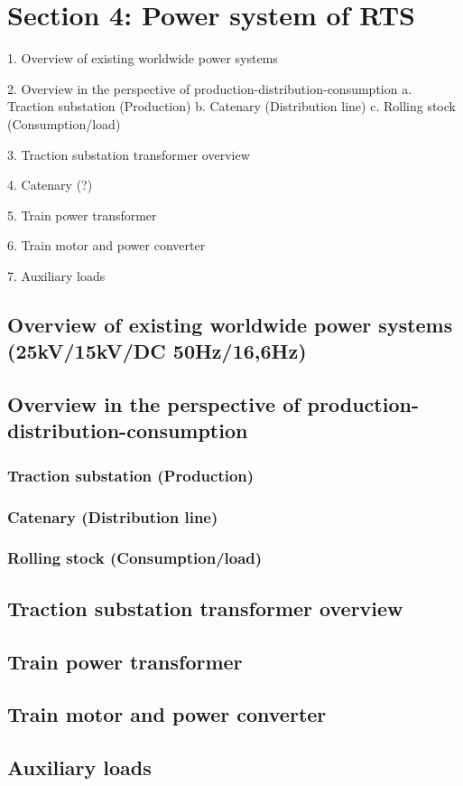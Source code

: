 




\section{Section 4: Power system of RTS}

1.	Overview of existing worldwide power systems

2.	Overview in the perspective of production-distribution-consumption
a.	Traction substation (Production)
b.	Catenary (Distribution line)
c.	Rolling stock (Consumption/load)

3.	Traction substation transformer overview

4.	Catenary (?)

5.	Train power transformer

6.	Train motor and power converter

7.	Auxiliary loads

\subsection{Overview of existing worldwide power systems (25kV/15kV/DC 50Hz/16,6Hz)}

\subsection{Overview in the perspective of production-distribution-consumption}


\subsubsection{Traction substation (Production)}

\subsubsection{Catenary (Distribution line)}

\subsubsection{Rolling stock (Consumption/load)}

\subsection{Traction substation transformer overview}

\subsection{Train power transformer}

\subsection{Train motor and power converter}

\subsection{Auxiliary loads}